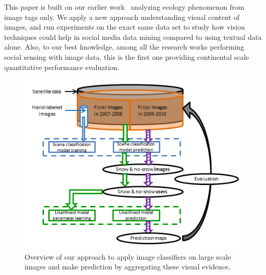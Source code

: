 This paper is built on our earlier work~\cite{ecology2012www}  analyzing ecology phenomenon from image tags only. We apply a new approach understanding visual content of images, and run experiments on the exact same data set to study how vision techniques could help in social media data mining compared to using textual data alone. Also, to our best knowledge, among all the research works performing social sensing with image data, this is the first one providing continental scale quantitative performance evaluation.


\begin{figure}
\centering
\includegraphics[scale=1]{figure/flowchartWevaluation.png}
\caption{Overview of our approach to apply image classifiers on large scale images and make prediction by aggregating these visual evidence. }
\label{fig:overview}
\end{figure}


